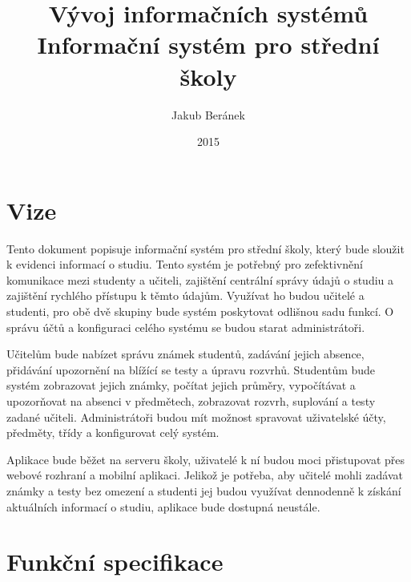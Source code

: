 \documentclass[a4paper,10pt,titlepage]{article}
\title{Vývoj informačních systémů\\Informační systém pro střední školy} %
\author{Jakub Beránek} %
\date{2015} %
\begin{document}
  \maketitle

	\section{Vize}
	Tento dokument popisuje informační systém pro střední školy, který bude sloužit k evidenci informací o studiu.
	Tento systém je potřebný pro zefektivnění komunikace mezi studenty a učiteli, zajištění centrální správy
	údajů o studiu a zajištění rychlého přístupu k těmto údajům.
	Využívat ho budou učitelé a studenti, pro obě dvě skupiny bude systém poskytovat odlišnou sadu funkcí.
	O správu účtů a konfiguraci celého systému se budou starat administrátoři.
	
	\vspace{5mm} %
	
	Učitelům bude nabízet správu známek studentů, zadávání jejich absence, přidávání upozornění na blížící se testy a úpravu rozvrhů.
	Studentům bude systém zobrazovat jejich známky, počítat jejich průměry, vypočítávat a upozorňovat na absenci v předmětech,
	zobrazovat rozvrh, suplování a testy zadané učiteli. Administrátoři budou mít možnost spravovat uživatelské účty, předměty, třídy a konfigurovat
	celý systém.
	
	\vspace{5mm} %
	
	Aplikace bude běžet na serveru školy, uživatelé k ní budou moci přistupovat přes webové rozhraní a mobilní aplikaci.
	Jelikož je potřeba, aby učitelé mohli zadávat známky a testy bez omezení a studenti jej budou využívat dennodenně k získání
	aktuálních informací o studiu, aplikace bude dostupná neustále.
	
	\section{Funkční specifikace}
\end{document}
